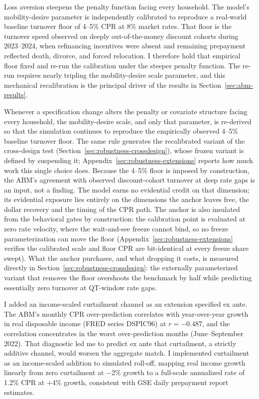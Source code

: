 \documentclass[12pt]{article}
\begin{document}
Loss aversion steepens the penalty function facing every household. The model's mobility-desire parameter is independently calibrated to reproduce a real-world baseline turnover floor of 4--5\% CPR at 8\% market rates. That floor is the turnover speed observed on deeply out-of-the-money discount cohorts during 2023--2024, when refinancing incentives were absent and remaining prepayment reflected death, divorce, and forced relocation. I therefore hold that empirical floor fixed and re-run the calibration under the steeper penalty function. The re-run requires nearly tripling the mobility-desire scale parameter, and this mechanical recalibration is the principal driver of the results in Section~\ref{sec:abm-results}.

Whenever a specification change alters the penalty or covariate structure facing every household, the mobility-desire scale, and only that parameter, is re-derived so that the simulation continues to reproduce the empirically observed 4--5\% baseline turnover floor. The same rule generates the recalibrated variant of the cross-design test (Section~\ref{sec:robustness-crossdesign}), whose frozen variant is defined by suspending it; Appendix~\ref{sec:robustness-extensions} reports how much work this single choice does. Because the 4--5\% floor is imposed by construction, the ABM's agreement with observed discount-cohort turnover at deep rate gaps is an input, not a finding. The model earns no evidential credit on that dimension; its evidential exposure lies entirely on the dimensions the anchor leaves free, the dollar recovery and the timing of the CPR path. The anchor is also insulated from the behavioral gates by construction: the calibration point is evaluated at zero rate velocity, where the wait-and-see freeze cannot bind, so no freeze parameterization can move the floor (Appendix~\ref{sec:robustness-extensions} verifies the calibrated scale and floor CPR are bit-identical at every freeze share swept). What the anchor purchases, and what dropping it costs, is measured directly in Section~\ref{sec:robustness-crossdesign}: the externally parameterized variant that removes the floor overshoots the benchmark by half while predicting essentially zero turnover at QT-window rate gaps.

I added an income-scaled curtailment channel as an extension specified ex ante. The ABM's monthly CPR over-prediction correlates with year-over-year growth in real disposable income (FRED series DSPIC96) at $r = -0.487$, and the correlation concentrates in the worst over-prediction months (June--September 2022). That diagnostic led me to predict ex ante that curtailment, a strictly additive channel, would worsen the aggregate match. I implemented curtailment as an income-scaled addition to simulated roll-off, mapping real income growth linearly from zero curtailment at $-2$\% growth to a full-scale annualized rate of 1.2\% CPR at +4\% growth, consistent with GSE daily prepayment report estimates.
\end{document}
